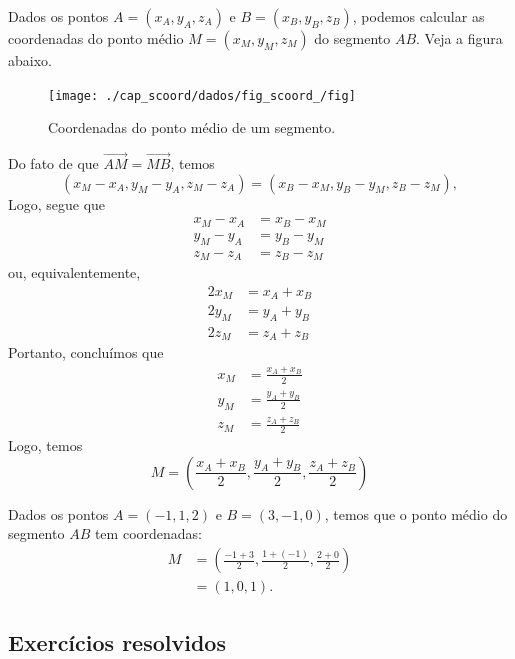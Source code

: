 \begin{obs}
  Dados os pontos $A = (x_A,y_A,z_A)$ e $B = (x_B,y_B,z_B)$, podemos calcular as coordenadas do ponto médio $M = (x_M,y_M,z_M)$ do segmento $AB$. Veja a figura abaixo.

\begin{figure}[H]
  \centering
  \texttt{[image: ./cap\_scoord/dados/fig\_scoord\_/fig]}
  \caption{Coordenadas do ponto médio de um segmento.}
  \label{fig:scoord_pm}
\end{figure}  

  Do fato de que $\overrightarrow{AM} = \overrightarrow{MB}$, temos
  \begin{equation}
    (x_M-x_A,y_M-y_A,z_M-z_A)=(x_B-x_M,y_B-y_M,z_B-z_M),
  \end{equation}
  Logo, segue que
  \begin{align}
    x_M-x_A &= x_B-x_M\\
    y_M-y_A &= y_B-y_M\\
    z_M-z_A &= z_B-z_M
  \end{align}
  ou, equivalentemente,
  \begin{align}
    2x_M &= x_A+x_B\\
    2y_M &= y_A+y_B\\
    2z_M &= z_A+z_B
  \end{align}
  Portanto, concluímos que
  \begin{align}
    x_M &= \frac{x_A+x_B}{2}\\
    y_M &= \frac{y_A+y_B}{2}\\
    z_M &= \frac{z_A+z_B}{2}
  \end{align}  
  Logo, temos
  \begin{equation}
  M = \left(\frac{x_A+x_B}{2},\frac{y_A+y_B}{2},\frac{z_A+z_B}{2}\right)
\end{equation}
\end{obs}

\begin{ex}
  Dados os pontos $A = (-1,1,2)$ e $B = (3,-1,0)$, temos que o ponto médio do segmento $AB$ tem coordenadas:
  \begin{align}
    M &= \left(\frac{-1+3}{2},\frac{1+(-1)}{2},\frac{2+0}{2}\right)\\
    &= (1,0,1).
  \end{align}
\end{ex}

\subsection*{Exercícios resolvidos}

